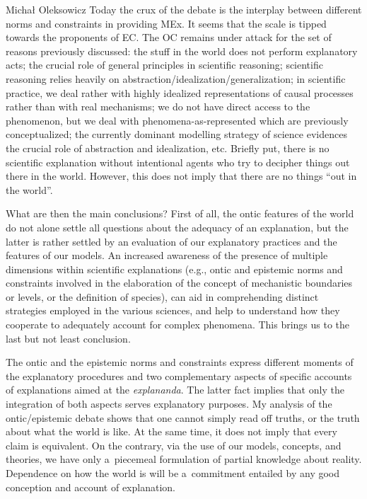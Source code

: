 \begin{artengenv}{Michał Oleksowicz}
Today the crux of the debate is the interplay between different norms and constraints in providing MEx. It seems that the scale is tipped towards the proponents of EC. The OC remains under attack for the set of reasons previously discussed: the stuff in the world does not perform explanatory acts; the crucial role of general principles in scientific reasoning; scientific reasoning relies heavily on abstraction/idealization/generalization; in scientific practice, we deal rather with highly idealized representations of causal processes rather than with real mechanisms; we do not have direct access to the phenomenon, but we deal with phenomena-as-represented which are previously conceptualized; the currently dominant modelling strategy of science evidences the crucial role of abstraction and idealization, etc. Briefly put, there is no scientific explanation without intentional agents who try to decipher things out there in the world. However, this does not imply that there are no things ``out in the world''.

What are then the main conclusions? First of all, the ontic features of the world do not alone settle all questions about the adequacy of an explanation, but the latter is rather settled by an evaluation of our explanatory practices and the features of our models. An increased awareness of the presence of multiple dimensions within scientific explanations (e.g., ontic and epistemic norms and constraints involved in the elaboration of the concept of mechanistic boundaries or levels, or the definition of species), can aid in comprehending distinct strategies employed in the various sciences, and help to understand how they cooperate to adequately account for complex phenomena. This brings us to the last but not least conclusion.

The ontic and the epistemic norms and constraints express different moments of the explanatory procedures and two complementary aspects of specific accounts of explanations aimed at the \textit{explananda}. The latter fact implies that only the integration of both aspects serves explanatory purposes. My analysis of the ontic/epistemic debate shows that one cannot simply read off truths, or the truth about what the world is like. At the same time, it does not imply that every claim is equivalent. On the contrary, via the use of our models, concepts, and theories, we have only a~piecemeal formulation of partial knowledge about reality. Dependence on how the world is will be a~commitment entailed by any good conception and account of explanation.

\end{artengenv}
